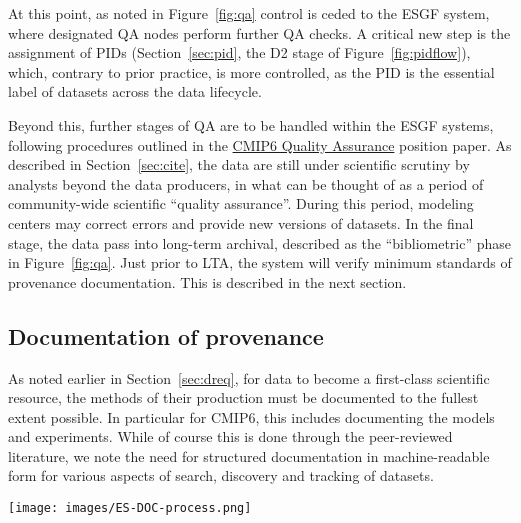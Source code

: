 \documentclass[gmd,manuscript]{copernicus}
\newcommand{\figref}[1] {\mbox{Figure   \ref{fig:#1}}}
\newcommand{\secref}[1] {\mbox{Section  \ref{sec:#1}}}
\begin{document}
At this point, as noted in \figref{qa} control is ceded to the ESGF
system, where designated QA nodes perform further QA checks. A
critical new step is the assignment of PIDs (\secref{pid}, the D2
stage of \figref{pidflow}), which, contrary to prior practice, is more
controlled, as the PID is the essential label of datasets across the
data lifecycle.

Beyond this, further stages of QA are to be handled within the ESGF
systems, following procedures outlined in the
\href{https://goo.gl/eEr8bS}{CMIP6 Quality Assurance} position paper.
As described in \secref{cite}, the data are still under scientific
scrutiny by analysts beyond the data producers, in what can be thought
of as a period of community-wide scientific ``quality assurance''.
During this period, modeling centers may correct errors and provide new
versions of datasets. In the final stage, the data pass into long-term
archival, described as the ``bibliometric'' phase in \figref{qa}. Just
prior to LTA, the system will verify minimum standards of
provenance documentation. This is described in the next section.

\subsection{Documentation of provenance}
\label{sec:doc}

As noted earlier in \secref{dreq}, for data to become a first-class
scientific resource, the methods of their production must be documented
to the fullest extent possible. In particular for CMIP6, this includes
documenting the models and experiments. While of course this is done
through the peer-reviewed literature, we note the need for structured
documentation in machine-readable form for various aspects of search,
discovery and tracking of datasets.

\begin{figure*}
  \begin{center}
    \texttt{[image: images/ES-DOC-process.png]}
  \end{center}
  \caption{Flowchart of ES-DOC documentation process, delineating
    sequence of events and indicating the parties responsible for
    producing the documentation. Figure courtesy Eric Guilyardi and
    Mark Greenslade.}
  \label{fig:esdoc}
\end{figure*}
\end{document}
